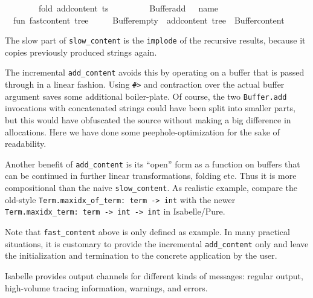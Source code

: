 \begin{isabellebody}
\ \ \ \ \ \ \ \ fold\ add{}content\ ts\ {}{}\isanewline
\ \ \ \ \ \ \ \ Buffer{}add\ {}{}{}{}{}\ {}\ name\ {}\ {}{}{}{}{}\isanewline
\isanewline
\ \ fun\ fast{}content\ tree\ {}\isanewline
\ \ \ \ Buffer{}empty\ {}{}\ add{}content\ tree\ {}{}\ Buffer{}content{}\isanewline
{}%
\endisatagML
{\isafoldML}%
%
\isadelimML
%
\endisadelimML
%
\begin{isamarkuptext}%
The slow part of \verb|slow_content| is the \verb|implode| of
  the recursive results, because it copies previously produced strings
  again.

  The incremental \verb|add_content| avoids this by operating on a
  buffer that is passed through in a linear fashion.  Using \verb|#>| and contraction over the actual buffer argument saves some
  additional boiler-plate.  Of course, the two \verb|Buffer.add|
  invocations with concatenated strings could have been split into
  smaller parts, but this would have obfuscated the source without
  making a big difference in allocations.  Here we have done some
  peephole-optimization for the sake of readability.

  Another benefit of \verb|add_content| is its ``open'' form as a
  function on buffers that can be continued in further linear
  transformations, folding etc.  Thus it is more compositional than
  the naive \verb|slow_content|.  As realistic example, compare the
  old-style \verb|Term.maxidx_of_term: term -> int| with the newer
  \verb|Term.maxidx_term: term -> int -> int| in Isabelle/Pure.

  Note that \verb|fast_content| above is only defined as example.  In
  many practical situations, it is customary to provide the
  incremental \verb|add_content| only and leave the initialization and
  termination to the concrete application by the user.%
\end{isamarkuptext}%
\isamarkuptrue%
%
\isamarkuptrue%
%
\begin{isamarkuptext}%
Isabelle provides output channels for different kinds of
  messages: regular output, high-volume tracing information, warnings,
  and errors.


\end{isamarkuptext}
\end{isabellebody}
